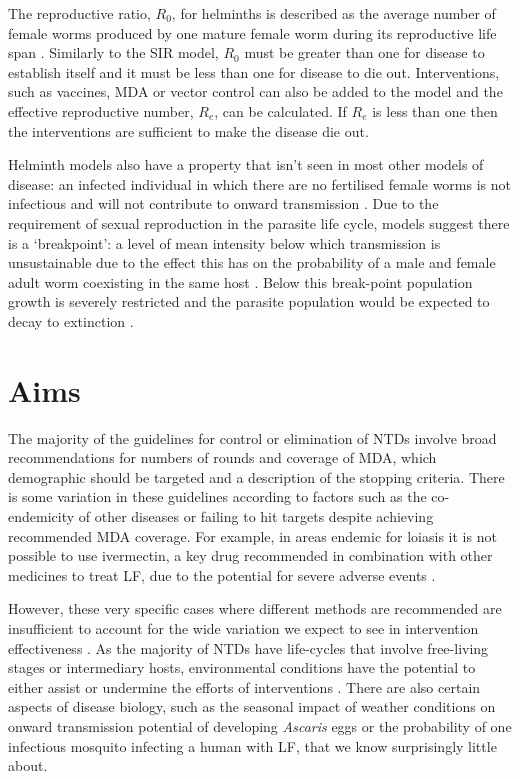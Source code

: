 The reproductive ratio, $R_0$, for helminths is described as the average number of female worms produced by one mature female worm during its reproductive life span \cite{Anderson1992}. Similarly to the SIR model, $R_0$ must be greater than one for disease to establish itself and it must be less than one for disease to die out. Interventions, such as vaccines, MDA or vector control can also be added to the model and the effective reproductive number, $R_e$, can be calculated. If $R_e$ is less than one then the interventions are sufficient to make the disease die out.

Helminth models also have a property that isn't seen in most other models of disease: an infected individual in which there are no fertilised female worms is not infectious and will not contribute to onward transmission \cite{WHOLF}. Due to the requirement of sexual reproduction in the parasite life cycle, models suggest there is a `\gls{breakpoint}': a level of mean intensity below which transmission is unsustainable due to the effect this has on the probability of a male and female adult worm coexisting in the same host \cite{Hardwick2019}. Below this break-point population growth is severely restricted and the parasite population would be expected to decay to extinction \cite{Anderson1985}. 

\section{Aims}

The majority of the guidelines for control or elimination of NTDs involve broad recommendations for numbers of rounds and coverage of MDA, which demographic should be targeted and a description of the stopping criteria. There is some variation in these guidelines according to factors such as the co-endemicity of other diseases or failing to hit targets despite achieving recommended MDA coverage. For example, in areas endemic for loiasis it is not possible to use ivermectin, a key drug recommended in combination with other medicines to treat LF, due to the potential for severe adverse events \cite{WHO_lfguideline}. 

However, these very specific cases where different methods are recommended are insufficient to account for the wide variation we expect to see in intervention effectiveness \cite{Dean2016}. As the majority of NTDs have life-cycles that involve free-living stages or intermediary hosts, environmental conditions have the potential to either assist or undermine the efforts of interventions \cite{Gunawardena,Zhang2013,LiTeng2017}. There are also certain aspects of disease biology, such as the seasonal impact of weather conditions on onward transmission potential of developing \textit{Ascaris} eggs or the probability of one infectious mosquito infecting a human with LF, that we know surprisingly little about.


